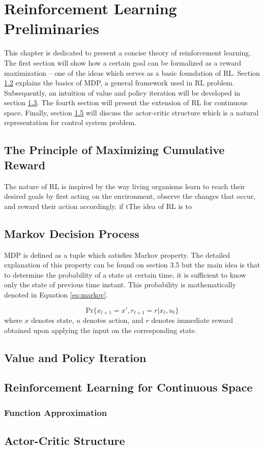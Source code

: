 \chapter{Reinforcement Learning Preliminaries}
This chapter is dedicated to present a concise theory of reinforcement learning. The first section will show how a certain goal can be formalized as a reward maximization -- one of the ideas which serves as a basic foundation of \ac{RL}. Section \ref{sec:mdp} explains the basics of \ac{MDP}, a general framework used in \ac{RL} problem. Subsequently, an intuition of value and policy iteration will be developed in section \ref{sec:value_iter}. The fourth section will present the extension of \ac{RL} for continuous space. Finally, section \ref{sec:actor} will discuss the actor-critic structure which is a natural representation for control system problem.

\section{The Principle of Maximizing Cumulative Reward}
The nature of \ac{RL} is inspired by the way living organisms learn to reach their desired goals by first acting on the environment, observe the changes that occur, and reward their action accordingly. if tThe idea of \ac{RL} is to 

\section{Markov Decision Process} \label{sec:mdp}
\ac{MDP} is defined as a tuple which satisfies Markov property. The detailed explanation of this property can be found on \cite{sutton1998reinforcement} section 3.5 but the main idea is that to determine the probability of a state at certain time, it is sufficient to know only the state of previous time instant. This probability is mathematically denoted in Equation \eqref{eq:markov}.

\begin{equation}
	\text{Pr}\{x_{t+1} = x', r_{t+1} = r| x_t, u_t \}
	\label{eq:markov}
\end{equation}
where $x$ denotes state, $u$ denotes action, and $r$ denotes immediate reward obtained upon applying the input on the corresponding state.

\section{Value and Policy Iteration} \label{sec:value_iter}

\section{Reinforcement Learning for Continuous Space}
\subsection{Function Approximation}


\section{Actor-Critic Structure} \label{sec:actor}
